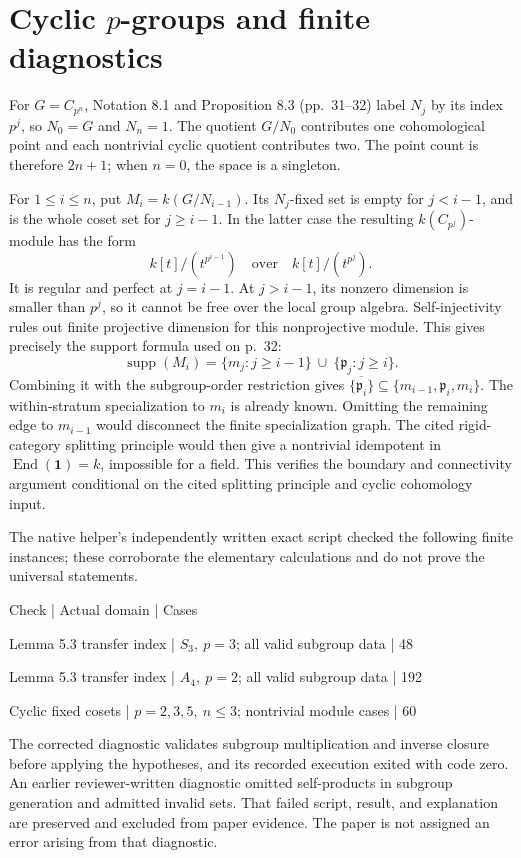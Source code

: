 \documentclass[10pt]{article}
\begin{document}
\section*{Cyclic \(p\)-groups and finite diagnostics}
For \(G=C_{p^n}\), Notation 8.1 and Proposition 8.3 (pp. 31–32) label \(N_j\) by its index \(p^j\), so \(N_0=G\) and \(N_n=1\). The quotient \(G/N_0\) contributes one cohomological point and each nontrivial cyclic quotient contributes two. The point count is therefore \(2n+1\); when \(n=0\), the space is a singleton.\par
For \(1\le i\le n\), put \(M_i=k(G/N_{i-1})\). Its \(N_j\)-fixed set is empty for \(j<i-1\), and is the whole coset set for \(j\ge i-1\). In the latter case the resulting \(k(C_{p^j})\)-module has the form \[k[t]/(t^{p^{i-1}})\quad\text{over}\quad k[t]/(t^{p^j}).\] It is regular and perfect at \(j=i-1\). At \(j>i-1\), its nonzero dimension is smaller than \(p^j\), so it cannot be free over the local group algebra. Self-injectivity rules out finite projective dimension for this nonprojective module. This gives precisely the support formula used on p. 32: \[\operatorname{supp}(M_i)=\{m_j:j\ge i-1\}\ \cup\ \{\mathfrak p_j:j\ge i\}.\] Combining it with the subgroup-order restriction gives \(\overline{\{\mathfrak p_i\}}\subseteq\{m_{i-1},\mathfrak p_i,m_i\}\). The within-stratum specialization to \(m_i\) is already known. Omitting the remaining edge to \(m_{i-1}\) would disconnect the finite specialization graph. The cited rigid-category splitting principle would then give a nontrivial idempotent in \(\operatorname{End}(\mathbf1)=k\), impossible for a field. This verifies the boundary and connectivity argument conditional on the cited splitting principle and cyclic cohomology input.\par
The native helper’s independently written exact script checked the following finite instances; these corroborate the elementary calculations and do not prove the universal statements.\par
Check | Actual domain | Cases\par
Lemma 5.3 transfer index | \(S_3,\ p=3\); all valid subgroup data | 48\par
Lemma 5.3 transfer index | \(A_4,\ p=2\); all valid subgroup data | 192\par
Cyclic fixed cosets | \(p=2,3,5,\ n\le3\); nontrivial module cases | 60\par
The corrected diagnostic validates subgroup multiplication and inverse closure before applying the hypotheses, and its recorded execution exited with code zero. An earlier reviewer-written diagnostic omitted self-products in subgroup generation and admitted invalid sets. That failed script, result, and explanation are preserved and excluded from paper evidence. The paper is not assigned an error arising from that diagnostic.\par
\end{document}

